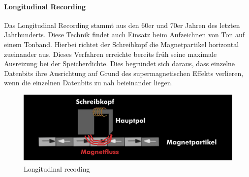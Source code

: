 \documentclass[a4paper, DIV20, 12pt, headsepline, parskip, flushleft]{scrartcl}
\begin{document}
\paragraph{Longitudinal Recording}
Das Longitudinal Recording stammt aus den 60er und 70er Jahren des letzten Jahrhunderts. Diese Technik findet auch Einsatz beim Aufzeichnen von Ton auf einem Tonband. Hierbei richtet der Schreibkopf die Magnetpartikel horizontal zueinander aus. 
Dieses Verfahren erreichte bereits früh seine maximale Ausreizung bei der Speicherdichte. Dies begründet sich daraus, dass einzelne Datenbits ihre Ausrichtung auf Grund des supermagnetischen Effekts verlieren, wenn die einzelnen Datenbits zu nah beieinander liegen. 
\begin{figure}[H]
\begin{center}
\includegraphics[scale=0.5]{prinzip-des-longitudinal-recording-lmr.png}
\end{center}
\caption{Longitudinal recoding \textsuperscript{\cite{img:lmr}}}
\end{figure}
\end{document}
